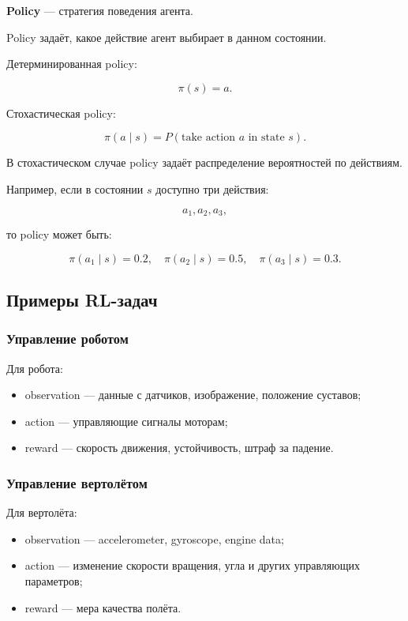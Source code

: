 \documentclass[a4paper,12pt]{article}
\begin{document}
\textbf{Policy} --- стратегия поведения агента.

Policy задаёт, какое действие агент выбирает в данном состоянии.

Детерминированная policy:

\[
\pi(s) = a.
\]

Стохастическая policy:

\[
\pi(a \mid s)
=
P(\text{take action } a \text{ in state } s).
\]

В стохастическом случае policy задаёт распределение вероятностей по действиям.

Например, если в состоянии \(s\) доступно три действия:

\[
a_1, a_2, a_3,
\]

то policy может быть:

\[
\pi(a_1 \mid s)=0.2,
\quad
\pi(a_2 \mid s)=0.5,
\quad
\pi(a_3 \mid s)=0.3.
\]

\subsection{Примеры RL-задач}

\subsubsection{Управление роботом}

Для робота:

\begin{itemize}
    \item observation --- данные с датчиков, изображение, положение суставов;
    \item action --- управляющие сигналы моторам;
    \item reward --- скорость движения, устойчивость, штраф за падение.
\end{itemize}

\subsubsection{Управление вертолётом}

Для вертолёта:

\begin{itemize}
    \item observation --- accelerometer, gyroscope, engine data;
    \item action --- изменение скорости вращения, угла и других управляющих параметров;
    \item reward --- мера качества полёта.
\end{itemize}
\end{document}
